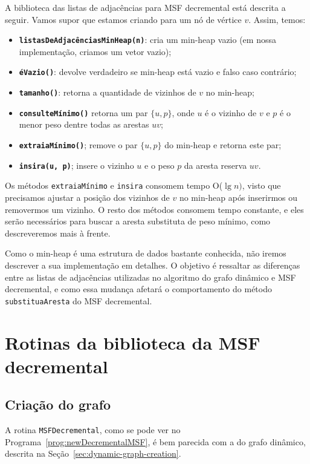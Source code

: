 A biblioteca das listas de adjacências para MSF decremental está descrita a seguir. Vamos supor que estamos criando para um nó de vértice $v$. Assim, temos:

\begin{itemize}
    \item \texttt{\textbf{listasDeAdjacênciasMinHeap(n)}}: cria um min-heap vazio (em nossa implementação, criamos um vetor vazio);
    \item \texttt{\textbf{éVazio()}}: devolve verdadeiro se min-heap está vazio e falso caso contrário;
    \item \texttt{\textbf{tamanho()}}: retorna a quantidade de vizinhos de $v$ no min-heap;
    \item \texttt{\textbf{consulteMínimo()}} retorna um par $\{u, p\}$, onde $u$ é o vizinho de $v$ e $p$ é o menor peso dentre todas as arestas $uv$;
    \item \texttt{\textbf{extraiaMínimo()}}; remove o par $\{u, p\}$ do min-heap e retorna este par;
    \item \texttt{\textbf{insira(u, p)}}; insere o vizinho $u$ e o peso $p$ da aresta reserva $uv$.

\end{itemize} 

Os métodos \texttt{extraiaMínimo} e \texttt{insira} consomem tempo O($\lg n)$, visto que precisamos ajustar a posição dos vizinhos de $v$ no min-heap após inserirmos ou removermos um vizinho. O resto dos métodos consomem tempo constante, e eles serão necessários para buscar a aresta substituta de peso mínimo, como descreveremos mais à frente.

Como o min-heap é uma estrutura de dados bastante conhecida, não iremos descrever a sua implementação em detalhes. O objetivo é ressaltar as diferenças entre as listas de adjacências utilizadas no algoritmo do grafo dinâmico e MSF decremental, e como essa mudança afetará o comportamento do método \texttt{substituaAresta} do MSF decremental.

\section{Rotinas da biblioteca da MSF decremental}

\subsection{Criação do grafo}

A rotina \texttt{MSFDecremental}, como se pode ver no Programa~\ref{prog:newDecrementalMSF}, é bem parecida com a do grafo dinâmico, descrita na Seção~\ref{sec:dynamic-graph-creation}. 

